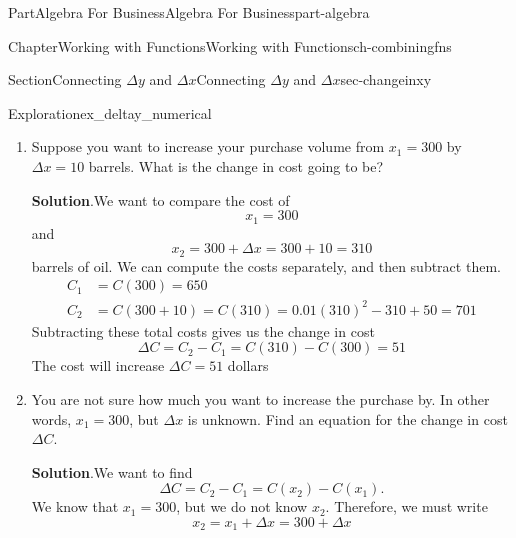 \documentclass{tufte-book}
\newcommand{\blocktitlefont}{\relax}
\numberwithin{equation}{chapter}
\newcommand{\amp}{&}
\begin{document}
\begin{partptx}{Part}{Algebra For Business}{}{Algebra For Business}{}{}{part-algebra}
\begin{chapterptx}{Chapter}{Working with Functions}{}{Working with Functions}{}{}{ch-combiningfns}
\begin{sectionptx}{Section}{\textasteriskcentered{}Connecting \(\Delta y\) and \(\Delta x\)}{}{\textasteriskcentered{}Connecting \(\Delta y\) and \(\Delta x\)}{}{}{sec-changeinxy}
\begin{exploration}{Exploration}{}{ex_deltay_numerical}
\begin{enumerate}[font=\bfseries,label=(\alph*),ref=\alph*]
\begin{equation*}
\end{equation*}
The second cost is the cost of 600 barrels%
\begin{equation*}
C_2 = C(400) = 0.01(400)^2 - 400 + 50 = 1250  
\end{equation*}
The change in the cost is therefore%
\begin{equation*}
\Delta C = C(400) - C(300) = 1250 - 650 = 600
\end{equation*}
The \(\Delta x=100\) additional barrels will increase the total cost by \textdollar{}600 (an average of \textdollar{}6 per barrel).%
\item{}Suppose you want to increase your purchase volume from \(x_1=300\) by \(\Delta x = 10\) barrels. What is the change in cost going to be?%
\par\smallskip%
\noindent\textbf{\blocktitlefont Solution}.\hypertarget{ex_deltay_numerical-4-2}{}\quad{}We want to compare the cost of%
\begin{equation*}
x_1=300
\end{equation*}
and%
\begin{equation*}
x_2 = 300+\Delta x = 300+10=310
\end{equation*}
barrels of oil.  We can compute the costs separately, and then subtract them.%
\begin{align*}
C_1 \amp= C(300) = 650 \\
C_2 \amp= C(300+10) = C(310) = 0.01(310)^2 - 310 + 50 = 701 
\end{align*}
Subtracting these total costs gives us the change in cost%
\begin{equation*}
\Delta C = C_2 - C_1 = C(310)- C(300) =51
\end{equation*}
The cost will increase \(\Delta C = 51\) dollars%
\item{}You are not sure how much you want to increase the purchase by.  In other words, \(x_1=300\), but \(\Delta x\) is unknown. Find an equation for the change in cost \(\Delta C\).%
\par\smallskip%
\noindent\textbf{\blocktitlefont Solution}.\hypertarget{ex_deltay_numerical-5-2}{}\quad{}We want to find%
\begin{equation*}
\Delta C = C_2 - C_1 = C(x_2) - C(x_1)\text{.}
\end{equation*}
We know that \(x_1 = 300\), but we do not know \(x_2\).  Therefore, we must write%
\begin{equation*}
x_2 = x_1 + \Delta x= 300 + \Delta x
\end{equation*}
%
\par

\end{enumerate}
\end{exploration}
\end{sectionptx}
\end{chapterptx}
\end{partptx}
\end{document}
